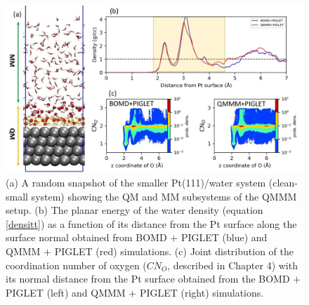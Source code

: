 \begin{figure}
    \centering
    \includegraphics[width=14cm ]{./Chapter3/figures/Slide15.jpg}
    \caption{(a) A random snapshot of the smaller Pt(111)/water system (clean-small system) showing the QM and MM subsystems of the QMMM setup. (b) The planar energy of the water density (equation \ref{densitt}) as a function of its distance from the Pt surface along the surface normal obtained from BOMD $+$ PIGLET (blue) and QMMM $+$ PIGLET (red) simulations. (c) Joint distribution of the coordination number of oxygen ($CN_{O}$, described in Chapter 4) with its normal distance from the Pt surface obtained from the BOMD $+$ PIGLET (left) and QMMM $+$ PIGLET (right) simulations. }
    \label{fig:Slide15}
\end{figure}


